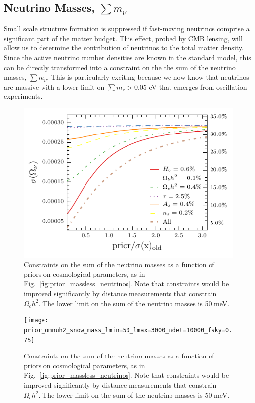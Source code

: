 \documentclass[aps,prd,reprint,superscriptaddress]{revtex4-1}
\newcommand{\reffig}[1]{Fig.~\ref{fig:#1}}
\begin{document}
\subsection{Neutrino Masses, $\sum m_\nu$}

Small scale structure formation is suppressed if fast-moving neutrinos comprise a significant part of the matter budget. This effect, probed by CMB lensing, will allow us to determine the contribution of neutrinos to the total matter density. Since the active neutrino number densities are known in the standard model, this can be directly transformed into a constraint on the the sum of the neutrino masses, $\sum m_\nu$. This is particularly exciting because we now know that neutrinos are massive with a lower limit on $\sum m_\nu>0.05$ eV that emerges from oscillation experiments. 



\begin{figure}[htbp]
\begin{center}
\includegraphics{prior_omnuh2_snow_mass_lmin=4_lmax=4499.pdf}
\caption{Constraints on the sum of the neutrino masses as a function of priors on cosmological parameters, as in \reffig{prior_massless_neutrinos}.  Note that constraints would be improved significantly  by distance measurements that constrain $\Omega_ch^2$. The lower limit on the sum of the neutrino masses is 50 meV.}
\label{fig:prior_omeganuh2}
\end{center}
\end{figure}

\begin{figure}[htbp]
\begin{center}
\texttt{[image: prior\_omnuh2\_snow\_mass\_lmin=50\_lmax=3000\_ndet=10000\_fsky=0.75]}
\caption{Constraints on the sum of the neutrino masses as a function of priors on cosmological parameters, as in \reffig{prior_massless_neutrinos}.  Note that constraints would be improved significantly  by distance measurements that constrain $\Omega_ch^2$. The lower limit on the sum of the neutrino masses is 50 meV.}
\label{fig:prior_omeganuh2_tau}
\end{center}
\end{figure}
\end{document}
